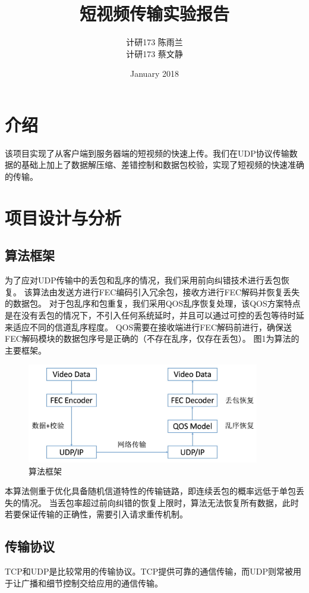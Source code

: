 \documentclass[onecolumn]{article}
\title{短视频传输实验报告}
\author{计研173 \quad 陈雨兰 \quad 2017310787  \\ 计研173 \quad 蔡文静 \quad 2017210866}
\date{January 2018}
\begin{document}
\begin{CJK*}{UTF8}{gbsn}

\maketitle
\section{介绍}
该项目实现了从客户端到服务器端的短视频的快速上传。我们在UDP协议传输数据的基础上加上了数据解压缩、差错控制和数据包校验，实现了短视频的快速准确的传输。

\section{项目设计与分析}
\subsection{算法框架}
为了应对UDP传输中的丢包和乱序的情况，我们采用前向纠错技术进行丢包恢复。
该算法由发送方进行FEC编码引入冗余包，接收方进行FEC解码并恢复丢失的数据包。
对于包乱序和包重复，我们采用QOS乱序恢复处理，该QOS方案特点是在没有丢包的情况下，不引入任何系统延时，并且可以通过可控的丢包等待时延来适应不同的信道乱序程度。
QOS需要在接收端进行FEC解码前进行，确保送FEC解码模块的数据包序号是正确的（不存在乱序，仅存在丢包）。
图1为算法的主要框架。

\begin{figure}[h]
	\centering
	\includegraphics[width=4in]{frame.jpg}
	\caption{算法框架}
	\label{fig:frame}
\end{figure}

本算法侧重于优化具备随机信道特性的传输链路，即连续丢包的概率远低于单包丢失的情况。
当丢包率超过前向纠错的恢复上限时，算法无法恢复所有数据，此时若要保证传输的正确性，需要引入请求重传机制。

\subsection{传输协议}
TCP和UDP是比较常用的传输协议。TCP提供可靠的通信传输，而UDP则常被用于让广播和细节控制交给应用的通信传输。

\end{CJK*}
\end{document}
